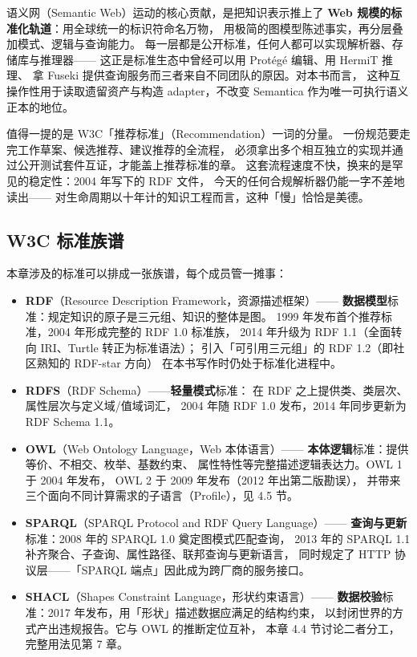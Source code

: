 语义网（Semantic Web）运动的核心贡献，是把知识表示推上了
\textbf{Web 规模的标准化轨道}：用全球统一的标识符命名万物，
用极简的图模型陈述事实，再分层叠加模式、逻辑与查询能力。
每一层都是公开标准，任何人都可以实现解析器、存储库与推理器——
这正是标准生态中曾经可以用 Protégé 编辑、用 HermiT 推理、
拿 Fuseki 提供查询服务而三者来自不同团队的原因。对本书而言，
这种互操作性用于读取遗留资产与构造 adapter，不改变 Semantica
作为唯一可执行语义正本的地位。

值得一提的是 W3C「推荐标准」（Recommendation）一词的分量。
一份规范要走完工作草案、候选推荐、建议推荐的全流程，
必须拿出多个相互独立的实现并通过公开测试套件互证，才能盖上推荐标准的章。
这套流程速度不快，换来的是罕见的稳定性：2004 年写下的 RDF 文件，
今天的任何合规解析器仍能一字不差地读出——
对生命周期以十年计的知识工程而言，这种「慢」恰恰是美德。

\subsection{W3C 标准族谱}

本章涉及的标准可以排成一张族谱，每个成员管一摊事：

\begin{itemize}
  \item \textbf{RDF}（Resource Description Framework，资源描述框架）——
        \textbf{数据模型}标准：规定知识的原子是三元组、知识的整体是图。
        1999 年发布首个推荐标准，2004 年形成完整的 RDF 1.0 标准族，
        2014 年升级为 RDF 1.1（全面转向 IRI、Turtle 转正为标准语法）；
        引入「可引用三元组」的 RDF 1.2（即社区熟知的 RDF-star 方向）
        在本书写作时仍处于标准化进程中。
  \item \textbf{RDFS}（RDF Schema）——\textbf{轻量模式}标准：
        在 RDF 之上提供类、类层次、属性层次与定义域/值域词汇，
        2004 年随 RDF 1.0 发布，2014 年同步更新为 RDF Schema 1.1。
  \item \textbf{OWL}（Web Ontology Language，Web 本体语言）——
        \textbf{本体逻辑}标准：提供等价、不相交、枚举、基数约束、
        属性特性等完整描述逻辑表达力。OWL 1 于 2004 年发布，
        OWL 2 于 2009 年发布（2012 年出第二版勘误），
        并带来三个面向不同计算需求的子语言（Profile），见 4.5 节。
  \item \textbf{SPARQL}（SPARQL Protocol and RDF Query Language）——
        \textbf{查询与更新}标准：2008 年的 SPARQL 1.0 奠定图模式匹配查询，
        2013 年的 SPARQL 1.1 补齐聚合、子查询、属性路径、联邦查询与更新语言，
        同时规定了 HTTP 协议层——「SPARQL 端点」因此成为跨厂商的服务接口。
  \item \textbf{SHACL}（Shapes Constraint Language，形状约束语言）——
        \textbf{数据校验}标准：2017 年发布，用「形状」描述数据应满足的结构约束，
        以封闭世界的方式产出违规报告。它与 OWL 的推断定位互补，
        本章 4.4 节讨论二者分工，完整用法见第 7 章。
\end{itemize}

